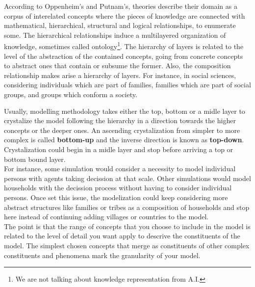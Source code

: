 \documentclass[11pt,oneside,a4paper,openright]{report}
\begin{document}
%
According to Oppenheim's and Putnam's\cite[p.1-2]{McGivernAndRueger}\cite{Unity_of_Science}, theories describe their domain as a corpus of interelated concepts where the pieces of knowledge are connected with mathematical, hierarchical, structural and logical relationships, to enumerate some. The hierarchical relationships induce a multilayered organization of knowledge, sometimes called ontology\footnote{We are not talking about knowledge representation from A.I.}. The hierarchy of layers is related to the level of the abstraction of the contained concepts, going from concrete concepts to abstract ones that contain or subsume the former. Also, the composition relationship makes arise a hierarchy of layers. For instance, in social sciences, considering individuals which are part of families, families which are part of social groups, and groups which conform a society. 





%

Usually, modelling methodology takes either the top, bottom or a midle layer to crystalize the model following the hierarchy in a direction towards the higher concepts or the deeper ones. An ascending crystalization from simpler to more complex is called \textbf{bottom-up} and the inverse direction is known as \textbf{top-down}. Crystalization could begin in a midle layer and stop before arriving a top or bottom bound layer.\\ 
For instance, some simulation would consider a necessity to model individual persons with agents taking decission at that scale. Other simulations would model households with the decission process without having to consider individual persons. Once set this issue, the modelization could keep considering more abstract structures like families or tribes as a composition of households and stop here instead of continuing adding villages or countries to the model.\\ 
The point is that the range of concepts that you choose to include in the model is related to the level of detail you want apply to descrive the constituents of the model. The simplest chosen concepts that merge as constituents of other complex constituents and phenomena mark the granularity of your model. 
\end{document}
